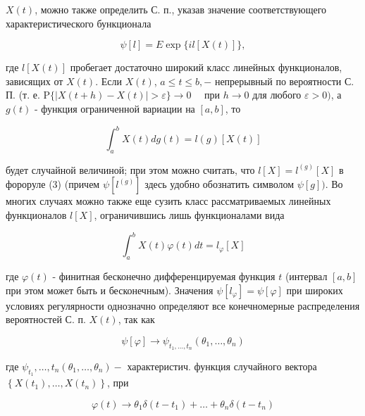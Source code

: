 \documentclass[10pt]{article}
\begin{document}
$X(t)$, можно также определить С. п., указав значение соответствующего характеристического бункционала



\[

\psi[l]=E \exp \{i l[X(t)]\},

\]



где $l[X(t)]$ пробегает достаточно широкий класс линейных функционалов, зависящих от $X(t)$. Если $X(t)$, $a \leqslant t \leqslant b,-$ непрерывный по вероятности С. П. (т. е. $\mathrm{P}\{|X(t+h)-X(t)|>\varepsilon\} \rightarrow 0 \quad$ при $h \rightarrow 0$ для любого $\varepsilon>0)$, а $g(t)$ - функция ограниченной вариации на $[a, b]$, то



\[

\int_{a}^{b} X(t) d g(t)=l(g)[X(t)]

\]



будет случайной величиной; при этом можно считать, что $l[X]=l^{(g)}[X]$ в фороруле (3) (причем $\psi\left[l^{(g)}\right]$ здесь удобно обознатить символом $\psi[g])$. Во многих случаях можно также еще сузить класс рассматриваемых линейных функционалов $l[X]$, ограничившись лишь функционалами вида



\[

\int_{a}^{b} X(t) \varphi(t) d t=l_{\varphi}[X]

\]



где $\varphi(t)$ - финитная бесконечно дифференцируемая функция $t$ (интервал $[a, b]$ при этом может быть и бесконечным). Значения $\psi\left[l_{\varphi}\right]=\psi[\varphi]$ при широких условиях регулярности однозначно определяют все конечномерные распределения вероятностей С. п. $X(t)$, так как



\[

\psi[\varphi] \longrightarrow \psi_{t_{1}, \ldots, t_{n}}\left(\theta_{1}, \ldots, \theta_{n}\right)

\]



где $\psi_{t_{1}}, \ldots, t_{n}\left(\theta_{1}, \ldots, \theta_{n}\right)-$ характеристич. функция случайного вектора $\left\{X\left(t_{1}\right), \ldots, X\left(t_{n}\right)\right\}$, при



\[

\varphi(t) \longrightarrow \theta_{1} \delta\left(t-t_{1}\right)+\ldots+\theta_{n} \delta\left(t-t_{n}\right)

\]
\end{document}
